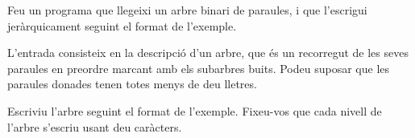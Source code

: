 


\Statement

Feu un programa que llegeixi un arbre binari de paraules,
i que l'escrigui jeràrquicament seguint el format de l'exemple.



\Input

L'entrada consisteix en la descripció d'un arbre, que és un recorregut de les
seves paraules en preordre marcant amb  els subarbres buits. Podeu
suposar que les paraules donades tenen totes menys de deu lletres.



\Output

Escriviu l'arbre seguint el format de l'exemple.
Fixeu-vos que cada nivell de l'arbre s'escriu usant deu caràcters.



\SampleOneCol
